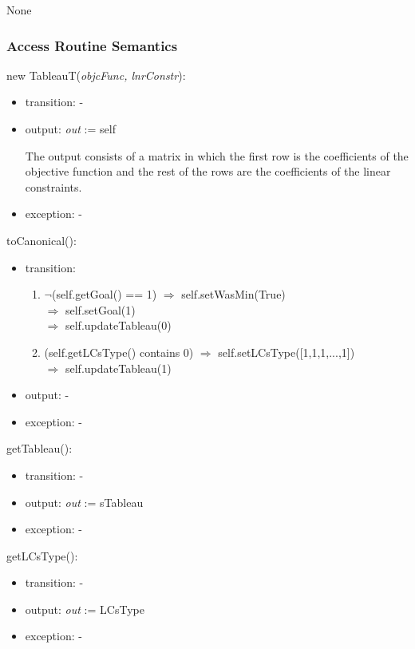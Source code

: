 \documentclass[12pt, titlepage]{article}
\begin{document}
None

\subsubsection{Access Routine Semantics}

\noindent 
new TableauT(\textit{objcFunc, lnrConstr}):
\begin{itemize}
	\item transition: -
	\item output: \textit{out} := self
	
	The output consists of a matrix in which the first row is the coefficients 
	of the objective function and the rest of the rows are the coefficients of 
	the linear constraints.
	
	\item exception: -
\end{itemize}

\noindent 
toCanonical():
\begin{itemize}
	\item transition: 
		\begin{enumerate}
			\item $\neg$(self.getGoal() == 1) \hspace{4cm} $\Rightarrow$ 
			self.setWasMin(True) \\
			\hspace*{8.3cm} $\Rightarrow$ self.setGoal(1) \\
			\hspace*{8.3cm} $\Rightarrow$ self.updateTableau(0)
			\item (self.getLCsType() contains 0) \hspace{2.65cm} $\Rightarrow$ 
			self.setLCsType([1,1,1,...,1]) \\
			\hspace*{8.3cm} $\Rightarrow$ self.updateTableau(1)
		\end{enumerate}
	\item output: -
	\item exception: -
\end{itemize}

\noindent 
getTableau():
\begin{itemize}
	\item transition: -
	\item output: \textit{out} := sTableau
	\item exception: -
\end{itemize}

\noindent 
getLCsType():
\begin{itemize}
	\item transition: -
	\item output: \textit{out} := LCsType
	\item exception: -
\end{itemize}
\end{document}
